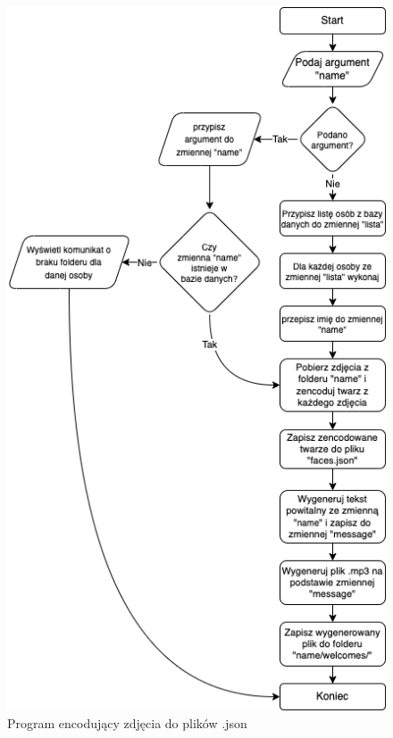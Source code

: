 \documentclass[a4paper,12pt,reqno]{article}
\begin{document}
\begin{figure}[H]%
\centering
\includegraphics[width=0.8\columnwidth]{imgs/generujacy.drawio.png}
\caption{Program encodujący zdjęcia do plików .json \cite{img_by_me} \label{algorytm_encode_faces}}
\quad
\end{figure}
\end{document}
